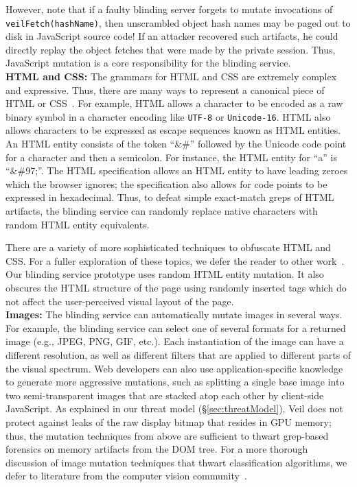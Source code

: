 However, note that if a faulty blinding server forgets to mutate invocations
of \texttt{veilFetch(hashName)}, then unscrambled object
hash names may be paged out to disk in JavaScript source code! If an attacker
recovered such artifacts, he could directly replay the
object fetches that were made by the private session.
Thus, JavaScript mutation is a core responsibility for
the blinding service.\\

\noindent
{\bf HTML and CSS:} The grammars for HTML and CSS are
extremely complex and expressive. Thus, there are many
ways to represent a canonical piece of HTML or
CSS~\cite{webAppObfuscation}. For example, HTML allows %
a character to be encoded as a raw binary symbol in a
character encoding like \texttt{UTF-8} or \texttt{Unicode-16}.
HTML also allows characters to be expressed as escape
sequences known as HTML entities. An HTML entity consists
of the token ``\&\#'' followed by the Unicode code point
for a character and then a semicolon. For instance, the
HTML entity for ``a'' is ``\&\#97;''. The HTML
specification allows an HTML entity to have leading
zeroes which the browser ignores; the specification
also allows for code points to be expressed in
hexadecimal. Thus, to defeat simple exact-match
greps of HTML artifacts, the blinding service
can randomly replace native characters with random
HTML entity equivalents.

There are a variety of more sophisticated techniques
to obfuscate HTML and CSS. For a fuller exploration
of these topics, we defer the reader to other
work~\cite{webAppObfuscation}. Our blinding service
prototype uses random HTML entity mutation. It also
obscures the HTML structure of the page using
randomly inserted tags which do not affect the
user-perceived visual layout of the page.\\

\noindent
{\bf Images:} The blinding service can automatically
mutate images in several ways. For example, the
blinding service can select one of several formats
for a returned image (e.g., JPEG, PNG, GIF, etc.).
Each instantiation of the image can have a different
resolution, as well as different filters that are
applied to different parts of the visual spectrum.
Web developers can also use application-specific
knowledge to generate more aggressive mutations,
such as splitting a single base image into two
semi-transparent images that are stacked atop each
other by client-side JavaScript. %
As explained in our threat model (\S\ref{sec:threatModel}),
Veil does not protect against leaks of the raw
display bitmap that resides in GPU memory; thus,
the mutation techniques from above are sufficient
to thwart grep-based forensics on memory artifacts from
the DOM tree. For a more thorough discussion
of image mutation techniques that thwart
classification algorithms, we defer to literature
from the computer vision community~\cite{biggio11}.\\

